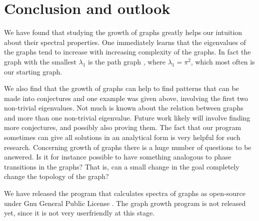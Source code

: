 \documentclass[a4paper]{article}
\begin{document}
\section{Conclusion and outlook}
We have found that studying the growth of graphs greatly helps our intuition about their spectral properties. One immediately learns that the eigenvalues of the graphs tend to increase with increasing complexity of the graphs. In fact the graph with the smallest $\lambda_1$ is the path graph \cite{nicaise1987spectre}, where $\lambda_1=\pi^2$, which most often is our starting graph. 

We also find that the growth of graphs can help to find patterns that can be made into conjectures and one example was given above, involving the first two non-trivial eigenvalues. Not much is known about the relation between graphs and more than one non-trivial eigenvalue. 
Future work likely will involve finding more conjectures, and possibly also proving them. The fact that our program sometimes can give all solutions in an analytical form is very helpful for such research. Concerning growth of graphs there is a huge number of questions to be answered. Is it for instance possible to have something analogous to phase transitions in the graphs? That is, can a small change in the goal completely change the topology of the graph?

We have released the program that calculates spectra of graphs as open-source under Gnu General Public License \cite{Pistol2016}. The graph growth program is not released yet, since it is not very userfriendly at this stage. 
 
\newpage


\end{document}
